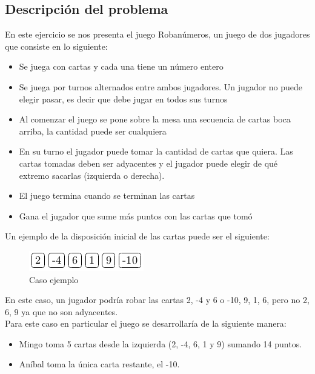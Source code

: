 \subsection{Descripci\'on del problema}

En este ejercicio se nos presenta el juego Roban\'umeros, un juego de dos jugadores que consiste en lo siguiente:

\begin{itemize}
\item Se juega con cartas y cada una tiene un n\'umero entero
\item Se juega por turnos alternados entre ambos jugadores. Un jugador no puede elegir pasar, es decir que debe jugar en todos sus turnos
\item Al comenzar el juego se pone sobre la mesa una secuencia de cartas boca arriba, la cantidad puede ser cualquiera
\item En su turno el jugador puede tomar la cantidad de cartas que quiera. Las cartas tomadas deben ser adyacentes y el jugador puede elegir de qu\'e extremo sacarlas (izquierda o derecha). 
\item El juego termina cuando se terminan las cartas
\item Gana el jugador que sume m\'as puntos con las cartas que tom\'o
\end{itemize}

Un ejemplo de la disposici\'on inicial de las cartas puede ser el siguiente:\\

\begin{figure}[h]
\begin{center}
\includegraphics[scale=0.6]{./img/ej1_explicacion1.png}
\caption{Caso ejemplo}
\end{center}
\end{figure}

En este caso, un jugador podr\'ia robar las cartas 2, -4 y 6 o -10, 9, 1, 6, pero no 2, 6, 9 ya que no son adyacentes. \\

Para este caso en particular el juego se desarrollar\'ia de la siguiente manera:

\begin{itemize}
\item Mingo toma 5 cartas desde la izquierda (2, -4, 6, 1 y 9) sumando 14 puntos.
\item An\'ibal toma la \'unica carta restante, el -10.
\end{itemize}

